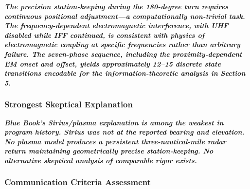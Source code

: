 \documentclass[11pt,letterpaper]{article}
\begin{document}
\textbf{\textit{The precision station-keeping during the 180-degree turn requires continuous positional adjustment---a computationally non-trivial task. The frequency-dependent electromagnetic interference, with UHF disabled while IFF continued, is consistent with physics of electromagnetic coupling at specific frequencies rather than arbitrary failure. The seven-phase sequence, including the proximity-dependent EM onset and offset, yields approximately 12--15 discrete state transitions encodable for the information-theoretic analysis in Section 5.}}


\subsubsection{Strongest Skeptical Explanation}

\textbf{\textit{Blue Book's Sirius/plasma explanation is among the weakest in program history. Sirius was not at the reported bearing and elevation. No plasma model produces a persistent three-nautical-mile radar return maintaining geometrically precise station-keeping. No alternative skeptical analysis of comparable rigor exists.}}


\subsubsection{Communication Criteria Assessment}
\end{document}
